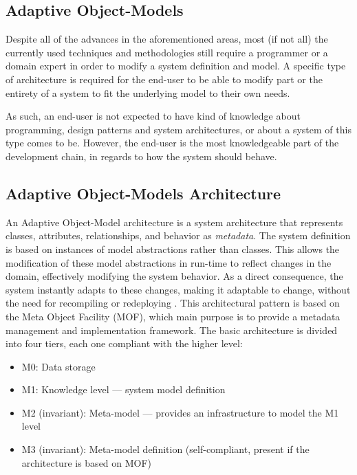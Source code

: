 \subsection{Adaptive Object-Models}\label{sec:aom}

Despite all of the advances in the aforementioned areas, most (if not all) the currently used techniques and methodologies still require a programmer or a domain expert in order to modify a system definition and model. A specific type of architecture is required for the end-user to be able to modify part or the entirety of a system to fit the underlying model to their own needs.

As such, an end-user is not expected to have kind of knowledge about programming, design patterns and system architectures, or about a system of this type comes to be. However, the end-user is the most knowledgeable part of the development chain, in regards to how the system should behave.

\subsection{Adaptive Object-Models Architecture}\label{sec:aom_architecture}

An Adaptive Object-Model architecture is a system architecture that represents classes, attributes, relationships, and behavior as \emph{metadata}. The system definition is based on instances of model abstractions rather than classes. This allows the modification of these model abstractions in run-time to reflect changes in the domain, effectively modifying the system behavior. As a direct consequence, the system instantly adapts to these changes, making it adaptable to change, without the need for recompiling or redeploying \cite{YBJ01}. This architectural pattern is based on the Meta Object Facility (MOF), which main purpose is to provide a metadata management and implementation framework. The basic architecture is divided into four tiers, each one compliant with the higher level: \cite{mof}

\begin{itemize}
  \item M0: Data storage
  \item M1: Knowledge level --- system model definition
  \item M2 (invariant): Meta-model --- provides an infrastructure to model the M1 level
  \item M3 (invariant): Meta-model definition (self-compliant, present if the architecture is based on MOF)
\end{itemize}

